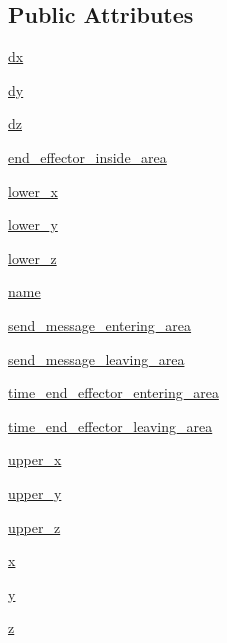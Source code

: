 \subsection*{Public Attributes}
\begin{DoxyCompactItemize}
\item 
\hyperlink{classRET__config_1_1Btn__area_aacddc911cdfe5cd5ec97b084754542d4}{dx}
\item 
\hyperlink{classRET__config_1_1Btn__area_a22b1a06ae09d552a5ca668a07885ebf1}{dy}
\item 
\hyperlink{classRET__config_1_1Btn__area_a71f0caccd6959b358543ee9cdc9b9c3e}{dz}
\item 
\hyperlink{classRET__config_1_1Btn__area_aef852a503e1c3a4a136a08fb7ccfdf34}{end\+\_\+effector\+\_\+inside\+\_\+area}
\item 
\hyperlink{classRET__config_1_1Btn__area_a253bff6f53fd0cf42fe16fae256db20d}{lower\+\_\+x}
\item 
\hyperlink{classRET__config_1_1Btn__area_abde8ef835f0f5ec35e19a41ea81635b9}{lower\+\_\+y}
\item 
\hyperlink{classRET__config_1_1Btn__area_aafde5bf16bebefaac407edbf1a82be2c}{lower\+\_\+z}
\item 
\hyperlink{classRET__config_1_1Btn__area_ab74e6bf80237ddc4109968cedc58c151}{name}
\item 
\hyperlink{classRET__config_1_1Btn__area_a83a922996b3291335a4a7e12ec0352c5}{send\+\_\+message\+\_\+entering\+\_\+area}
\item 
\hyperlink{classRET__config_1_1Btn__area_a1093600f9685edcc41b8846f856d4575}{send\+\_\+message\+\_\+leaving\+\_\+area}
\item 
\hyperlink{classRET__config_1_1Btn__area_a9187fb0045f227875406717af543604d}{time\+\_\+end\+\_\+effector\+\_\+entering\+\_\+area}
\item 
\hyperlink{classRET__config_1_1Btn__area_ac9034ace22eed6b580e2c01ba5b2e71d}{time\+\_\+end\+\_\+effector\+\_\+leaving\+\_\+area}
\item 
\hyperlink{classRET__config_1_1Btn__area_a5fc95389df55bf4e81e2c0eec403a7ee}{upper\+\_\+x}
\item 
\hyperlink{classRET__config_1_1Btn__area_af3d0698df9e9a8a5fb89a126a503bfbd}{upper\+\_\+y}
\item 
\hyperlink{classRET__config_1_1Btn__area_a5180143a531a7caaefecdd56d378de44}{upper\+\_\+z}
\item 
\hyperlink{classRET__config_1_1Btn__area_a9336ebf25087d91c818ee6e9ec29f8c1}{x}
\item 
\hyperlink{classRET__config_1_1Btn__area_a2fb1c5cf58867b5bbc9a1b145a86f3a0}{y}
\item 
\hyperlink{classRET__config_1_1Btn__area_a25ed1bcb423b0b7200f485fc5ff71c8e}{z}
\end{DoxyCompactItemize}


